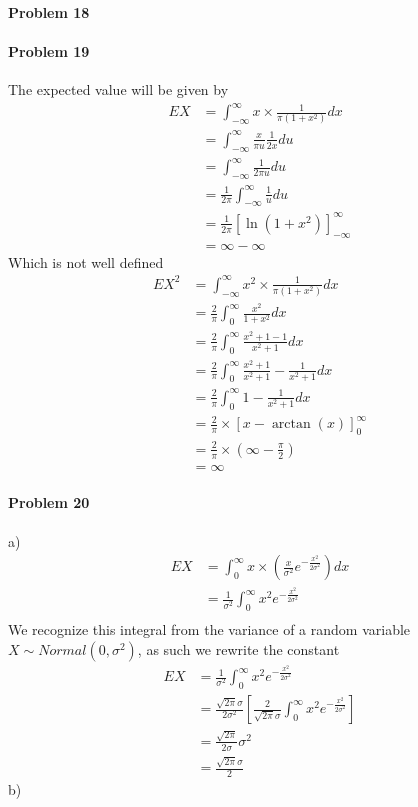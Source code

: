 \paragraph{Problem 18}
\paragraph{Problem 19}
The expected value will be given by
\begin{align*}
    EX&=\int_{-\infty}^{\infty}x\times\frac{1}{\pi(1+x^{2})}dx \\
      &=\int_{-\infty}^{\infty}\frac{x}{\pi u}\frac{1}{2x}du \\
      &=\int_{-\infty}^{\infty}\frac{1}{2\pi u}du \\
      &=\frac{1}{2\pi}\int_{-\infty}^{\infty}\frac{1}{u}du \\
      &=\frac{1}{2\pi}\left[\ln(1+x^{2})\right]_{-\infty}^{\infty} \\
      &=\infty-\infty
\end{align*}
Which is not well defined
\begin{align*}
    EX^{2}&=\int_{-\infty}^{\infty}x^{2}\times\frac{1}{\pi(1+x^{2})}dx \\
       &=\frac{2}{\pi}\int_{0}^{\infty}\frac{x^{2}}{1+x^{2}}dx \\
       &=\frac{2}{\pi}\int_{0}^{\infty}\frac{x^{2}+1-1}{x^{2}+1}dx \\
       &=\frac{2}{\pi}\int_{0}^{\infty}\frac{x^{2}+1}{x^{2}+1}-\frac{1}{x^{2}+1}dx \\
       &=\frac{2}{\pi}\int_{0}^{\infty}1-\frac{1}{x^{2}+1}dx \\
       &=\frac{2}{\pi}\times\left[x-\arctan(x)\right]_{0}^{\infty} \\
       &=\frac{2}{\pi}\times\left(\infty-\frac{\pi}{2}\right) \\
       &=\infty
\end{align*}
\paragraph{Problem 20}
a)
\begin{align*}
    EX&=\int_{0}^{\infty}x\times\left(\frac{x}{\sigma^{2}}e^{-\frac{x^{2}}{2\sigma^{2}}}\right)dx \\
      &=\frac{1}{\sigma^{2}}\int_{0}^{\infty}x^{2}e^{-\frac{x^{2}}{2\sigma^{2}}} \\
\end{align*}
We recognize this integral from the variance of a random variable $X\sim Normal(0,\sigma^{2})$, as such we rewrite the constant
\begin{align*}
    EX&=\frac{1}{\sigma^{2}}\int_{0}^{\infty}x^{2}e^{-\frac{x^{2}}{2\sigma^{2}}} \\
      &=\frac{\sqrt{2\pi}\sigma}{2\sigma^{2}}\left[\frac{2}{\sqrt{2\pi}\sigma}\int_{0}^{\infty}x^{2}e^{-\frac{x^{2}}{2\sigma^{2}}}\right] \\
      &=\frac{\sqrt{2\pi}}{2\sigma}\sigma^{2} \\
      &=\frac{\sqrt{2\pi}\sigma}{2}
\end{align*}
b)

